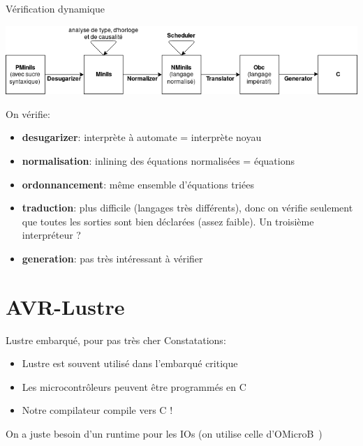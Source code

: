 \documentclass[xcolor={svgnames},aspectratio=169]{beamer}
\begin{document}
\begin{frame}{Vérification dynamique}
  \begin{center}
    \includegraphics[width=.8\paperwidth]{assets/chain.png}
  \end{center}
  On vérifie:
  \begin{itemize}
    \item \textbf{desugarizer}: interprète à automate = interprète noyau
    \item \textbf{normalisation}: inlining des équations normalisées = équations
    \item \textbf{ordonnancement}: même ensemble d'équations triées
    \item \textbf{traduction}: plus difficile (langages très différents), donc on vérifie seulement que toutes les sorties sont bien déclarées (assez faible). Un troisième interpréteur ?
    \item \textbf{generation}: pas très intéressant à vérifier
  \end{itemize}
\end{frame}

\section{AVR-Lustre}

\begin{frame}{Lustre embarqué, pour pas très cher}
  Constatations:
  \begin{itemize}
    \item Lustre est souvent utilisé dans l'embarqué critique
    \item Les microcontrôleurs peuvent être programmés en C
    \item Notre compilateur compile vers C !
  \end{itemize}

  On a juste besoin d'un runtime pour les IOs (on utilise celle d'OMicroB~\citep{VVC18})
\end{frame}
\end{document}
